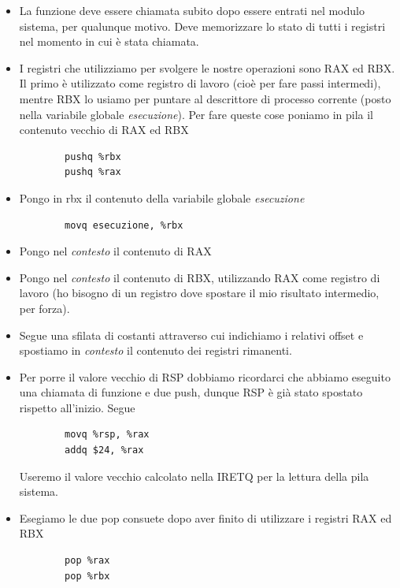 \begin{itemize}
	\item La funzione deve essere chiamata subito dopo essere entrati nel modulo sistema, per qualunque motivo. Deve memorizzare lo stato di tutti i registri nel momento in cui è stata chiamata. 
	\item I registri che utilizziamo per svolgere le nostre operazioni sono RAX ed RBX. Il primo è utilizzato come registro di lavoro (cioè per fare passi intermedi), mentre RBX lo usiamo per puntare al descrittore di processo corrente (posto nella variabile globale \emph{esecuzione}). Per fare queste cose poniamo in pila il contenuto vecchio di RAX ed RBX
	\begin{verbatim}
		pushq %rbx
		pushq %rax
	\end{verbatim}
	\item Pongo in rbx il contenuto della variabile globale \emph{esecuzione} 
	\begin{verbatim}
		movq esecuzione, %rbx
	\end{verbatim}
	\item Pongo nel \emph{contesto} il contenuto di RAX
	\item Pongo nel \emph{contesto} il contenuto di RBX, utilizzando RAX come registro di lavoro (ho bisogno di un registro dove spostare il mio risultato intermedio, per forza).
	\item Segue una sfilata di costanti attraverso cui indichiamo i relativi offset e spostiamo in \emph{contesto} il contenuto dei registri rimanenti.
	\item Per porre il valore vecchio di RSP dobbiamo ricordarci che abbiamo eseguito una chiamata di funzione e due push, dunque RSP è già stato spostato rispetto all'inizio. Segue
	\begin{verbatim}
		movq %rsp, %rax
		addq $24, %rax
	\end{verbatim} Useremo il valore vecchio calcolato nella IRETQ per la lettura della pila sistema.
	\item Esegiamo le due pop consuete dopo aver finito di utilizzare i registri RAX ed RBX
	\begin{verbatim}
		pop %rax
		pop %rbx
	\end{verbatim}
\end{itemize}

